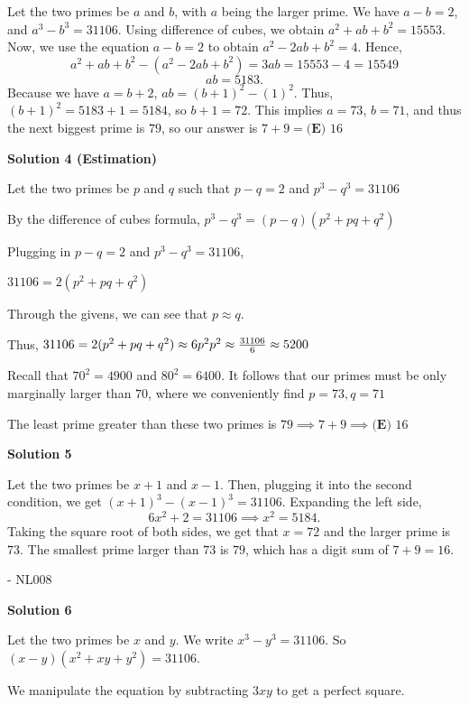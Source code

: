 \begin{enumerate}
Let the two primes be $a$ and $b$, with $a$ being the larger prime. We have $a - b = 2$, and $a^3 - b^3 = 31106$. Using difference of cubes, we obtain $a^2 + ab + b^2 = 15553$. Now, we use the equation $a - b = 2$ to obtain $a^2 - 2ab + b^2 = 4$. Hence, 
 \[a^2 + ab + b^2 - (a^2 - 2ab + b^2) = 3ab = 15553 - 4 = 15549\]
 \[ab = 5183.\]Because we have $a = b+2$, $ab = (b+1)^2 - (1)^2$. Thus, $(b+1)^2 = 5183 + 1 = 5184$, so $b+1 = 72$. This implies $a = 73$, $b = 71$, and thus the next biggest prime is $79$, so our answer is $7 + 9 = \boxed{\textbf{(E) }16}$




\textbf{Solution 4 (Estimation)}

Let the two primes be $p$ and $q$ such that $p-q=2$ and $p^{3}-q^{3}=31106$

 By the difference of cubes formula, $p^{3}-q^{3}=(p-q)(p^{2}+pq+q^{2})$

 Plugging in $p-q=2$ and $p^{3}-q^{3}=31106$,

 $31106=2(p^{2}+pq+q^{2})$

 Through the givens, we can see that $p \approx q$.

 Thus, $31106=2(p^{2}+pq+q^{2})\approx 6p^{2}\\p^2\approx \frac{31106}{6}\approx 5200$

 Recall that $70^2=4900$ and $80^2=6400$. It follows that our primes must be only marginally larger than $70$, where we conveniently find $p=73, q=71$

 The least prime greater than these two primes is $79 \implies 7 + 9 \implies \boxed{\textbf{(E) }16}$




\textbf{Solution 5}

Let the two primes be $x + 1$ and $x - 1$. Then, plugging it into the second condition, we get $(x + 1)^3 - (x - 1)^3 = 31106.$ Expanding the left side, 
 \[6x^2 + 2 = 31106 \implies x^2 = 5184.\] Taking the square root of both sides, we get that $x = 72$ and the larger prime is $73$. The smallest prime larger than $73$ is $79$, which has a digit sum of $7 + 9 = \boxed{16}.$

 - NL008

 



\textbf{Solution 6}

Let the two primes be $x$ and $y$. We write $x^3-y^3=31106$. So $(x-y)(x^2+xy+y^2)=31106$. 

 We manipulate the equation by subtracting $3xy$ to get a perfect square.


\end{enumerate}
